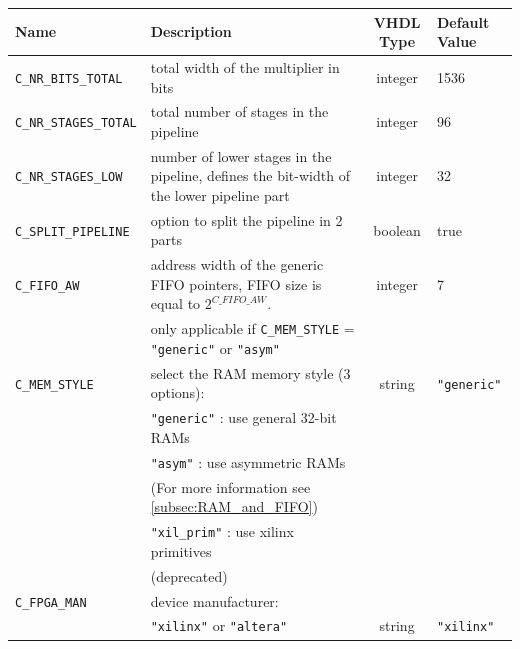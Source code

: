 \begin{center}
	\begin{tabular}{|l|p{6.5cm}|c|l|}
		\hline
		\rowcolor{Gray}
		\textbf{Name} & \textbf{Description} & \textbf{VHDL Type} &\textbf{Default Value} \bigstrut\\
		\hline
		\verb|C_NR_BITS_TOTAL| & total width of the multiplier in bits & integer & 1536\bigstrut\\
		\hline
		\verb|C_NR_STAGES_TOTAL| & total number of stages in the pipeline & integer & 96\bigstrut\\
		\hline
		\verb|C_NR_STAGES_LOW| & number of lower stages in the pipeline, defines the bit-width of the lower pipeline part & integer & 32 \bigstrut\\
		\hline
		\verb|C_SPLIT_PIPELINE| & option to split the pipeline in 2 parts & boolean & true \bigstrut\\
		\hline
		\verb|C_FIFO_AW| & address width of the generic FIFO pointers, FIFO size is equal to $2^{C\_FIFO\_AW} $. & integer & 7 \bigstrut\\
						 & only	applicable if \verb|C_MEM_STYLE| = \verb|"generic"| or \verb|"asym"|  & & \\
		\hline
		\verb|C_MEM_STYLE| & select the RAM memory style (3 options): & string & \verb|"generic"| \bigstrut\\
							& \verb|"generic"| : use general 32-bit RAMs & & \\
      						& \verb|"asym"| : use asymmetric RAMs & & \\
      						& (For more information see \ref{subsec:RAM_and_FIFO}) & & \\
      						& \verb|"xil_prim"| : use xilinx primitives & &\\
      						& (deprecated) & & \bigstrut[b] \\
		\hline
		\verb|C_FPGA_MAN| & device manufacturer: & & \\
						& \verb|"xilinx"| or \verb|"altera"| & string & \verb|"xilinx"| \bigstrut\\
		\hline
	\end{tabular}%
\end{center}

